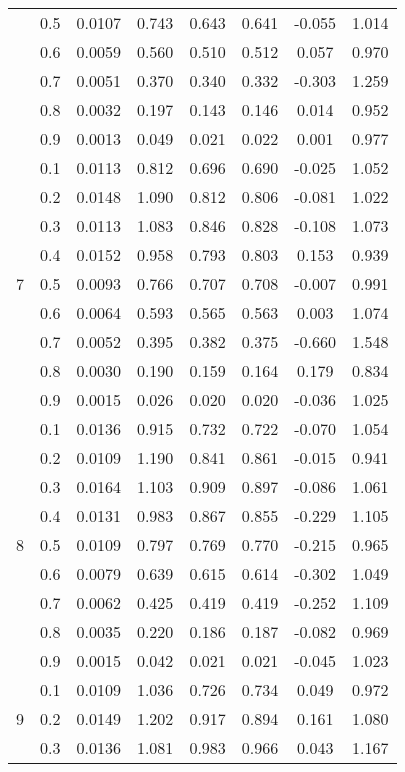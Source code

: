 \documentclass[11pt,a4paper]{report}
\begin{document}
\begin{longtable}{ | c | c || c | c | c | c | c | c | }
 & 0.5 & 0.0107 & 0.743 & 0.643 & 0.641 & -0.055 & 1.014 \\
 & 0.6 & 0.0059 & 0.560 & 0.510 & 0.512 & 0.057 & 0.970 \\
 & 0.7 & 0.0051 & 0.370 & 0.340 & 0.332 & -0.303 & 1.259 \\
 & 0.8 & 0.0032 & 0.197 & 0.143 & 0.146 & 0.014 & 0.952 \\
 & 0.9 & 0.0013 & 0.049 & 0.021 & 0.022 & 0.001 & 0.977 \\
 \hline
\multirow{9}{*}{7} & 0.1 & 0.0113 & 0.812 & 0.696 & 0.690 & -0.025 & 1.052 \\
 & 0.2 & 0.0148 & 1.090 & 0.812 & 0.806 & -0.081 & 1.022 \\
 & 0.3 & 0.0113 & 1.083 & 0.846 & 0.828 & -0.108 & 1.073 \\
 & 0.4 & 0.0152 & 0.958 & 0.793 & 0.803 & 0.153 & 0.939 \\
 & 0.5 & 0.0093 & 0.766 & 0.707 & 0.708 & -0.007 & 0.991 \\
 & 0.6 & 0.0064 & 0.593 & 0.565 & 0.563 & 0.003 & 1.074 \\
 & 0.7 & 0.0052 & 0.395 & 0.382 & 0.375 & -0.660 & 1.548 \\
 & 0.8 & 0.0030 & 0.190 & 0.159 & 0.164 & 0.179 & 0.834 \\
 & 0.9 & 0.0015 & 0.026 & 0.020 & 0.020 & -0.036 & 1.025 \\
 \hline
\multirow{9}{*}{8} & 0.1 & 0.0136 & 0.915 & 0.732 & 0.722 & -0.070 & 1.054 \\
 & 0.2 & 0.0109 & 1.190 & 0.841 & 0.861 & -0.015 & 0.941 \\
 & 0.3 & 0.0164 & 1.103 & 0.909 & 0.897 & -0.086 & 1.061 \\
 & 0.4 & 0.0131 & 0.983 & 0.867 & 0.855 & -0.229 & 1.105 \\
 & 0.5 & 0.0109 & 0.797 & 0.769 & 0.770 & -0.215 & 0.965 \\
 & 0.6 & 0.0079 & 0.639 & 0.615 & 0.614 & -0.302 & 1.049 \\
 & 0.7 & 0.0062 & 0.425 & 0.419 & 0.419 & -0.252 & 1.109 \\
 & 0.8 & 0.0035 & 0.220 & 0.186 & 0.187 & -0.082 & 0.969 \\
 & 0.9 & 0.0015 & 0.042 & 0.021 & 0.021 & -0.045 & 1.023 \\
 \hline
\multirow{9}{*}{9} & 0.1 & 0.0109 & 1.036 & 0.726 & 0.734 & 0.049 & 0.972 \\
 & 0.2 & 0.0149 & 1.202 & 0.917 & 0.894 & 0.161 & 1.080 \\
 & 0.3 & 0.0136 & 1.081 & 0.983 & 0.966 & 0.043 & 1.167 \\

\end{longtable}
\end{document}
